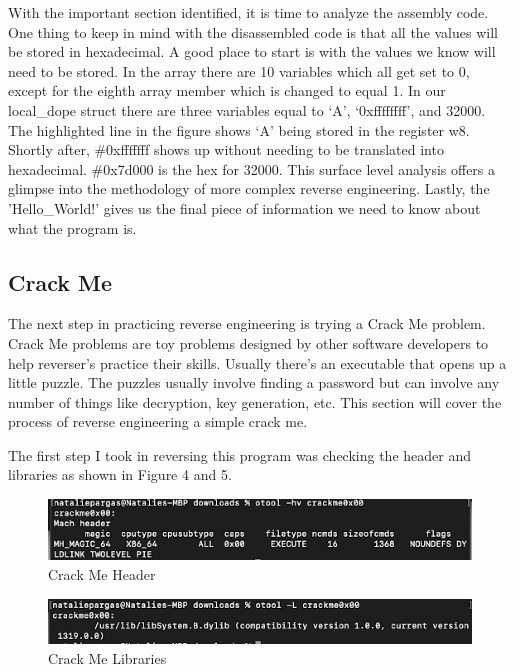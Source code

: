 With the important section identified, it is time to analyze the assembly code.
One thing to keep in mind with the disassembled code is that all the values will be stored in hexadecimal. 
A good place to start is with the values we know will need to be stored. 
In the array there are 10 variables which all get set to 0, except for the eighth array member which is changed to equal 1. 
In our local\_dope struct there are three variables equal to ‘A’, ‘0xffffffff’, and 32000. 
The highlighted line in the figure shows ‘A’ being stored in the register w8. Shortly after, \#0xfffffff shows up without needing to be translated into hexadecimal. 
\#0x7d000 is the hex for 32000. 
This surface level analysis offers a glimpse into the methodology of more complex reverse engineering. 
Lastly, the 'Hello\_World!' gives us the final piece of information we need to know about what the program is.

\subsection{Crack Me}
The next step in practicing reverse engineering is trying a Crack Me problem. 
Crack Me problems are toy problems designed by other software developers to help reverser's practice their skills. 
Usually there’s an executable that opens up a little puzzle. 
The puzzles usually involve finding a password but can involve any number of things like decryption, key generation, etc. 
This section will cover the process of reverse engineering a simple crack me.

The first step I took in reversing this program was checking the header and libraries as shown in Figure 4 and 5.
\begin{figure}[h]
	\caption{Crack Me Header}
	\includegraphics{crackmeheader.png}
\end{figure}
\begin{figure}[h]
	\caption{Crack Me Libraries}
	\includegraphics{crackmelibs.png}
\end{figure}

